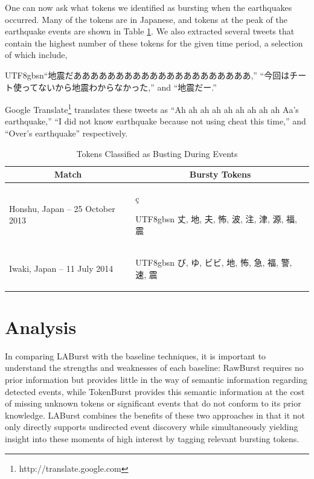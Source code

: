 \documentclass[letterpaper]{article}
\newcommand{\myfont}{gbsn}
\begin{document}
One can now ask what tokens we identified as bursting when the earthquakes occurred.
Many of the tokens are in Japanese, and tokens at the peak of the earthquake events are shown in Table \ref{tab:japanTokens}.
We also extracted several tweets that contain the highest number of these tokens for the given time period, a selection of which include, \begin{CJK}{UTF8}{\myfont}``地震だあああああああああああああああああああああ,'' ``今回はチート使ってないから地震わからなかった,'' and ``地震だー.'' \end{CJK}
Google Translate\footnote{http://translate.google.com} translates these tweets as ``Ah ah ah ah ah ah ah ah ah Aa's earthquake,'' ``I did not know earthquake because not using cheat this time,'' and ``Over's earthquake'' respectively.
%
\begin{table}[htdp]
\footnotesize
\caption{Tokens Classified as Busting During Events}
\begin{center}
\begin{tabular}{|p{1.45in} | p{1.45in} |}
\hline
\multicolumn{1}{|c|}{\textbf{Match}} & \multicolumn{1}{|c|}{\textbf{Bursty Tokens}} \\ \hline
Honshu, Japan -- 25 October 2013 & \c{c}\begin{CJK}{UTF8}{\myfont} 丈, 地, 夫, 怖, 波, 注, 津, 源, 福, 震 \end{CJK} \\ \hline
Iwaki, Japan -- 11 July 2014 & \begin{CJK}{UTF8}{\myfont} び, ゆ, ビビ, 地, 怖, 急, 福, 警, 速, 震 \end{CJK} \\ \hline
\end{tabular}
\end{center}
\label{tab:japanTokens}
\end{table}

\section{Analysis}
\label{sect:analysis}

In comparing LABurst with the baseline techniques, it is important to understand the strengths and weaknesses of each baseline: RawBurst requires no prior information but provides little in the way of semantic information regarding detected events, while TokenBurst provides this semantic information at the cost of missing unknown tokens or significant events that do not conform to its prior knowledge.
LABurst combines the benefits of these two approaches in that it not only directly supports undirected event discovery while simultaneously yielding insight into these moments of high interest by tagging relevant bursting tokens.
\end{document}
